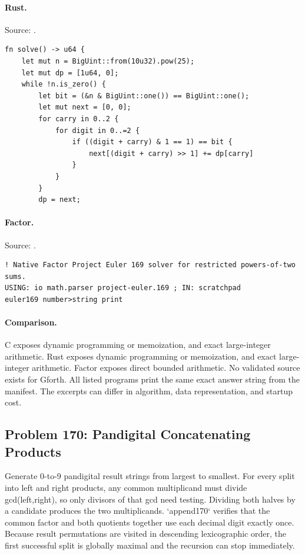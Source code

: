 \paragraph{Rust.} Source: .
\begin{lstlisting}
fn solve() -> u64 {
    let mut n = BigUint::from(10u32).pow(25);
    let mut dp = [1u64, 0];
    while !n.is_zero() {
        let bit = (&n & BigUint::one()) == BigUint::one();
        let mut next = [0, 0];
        for carry in 0..2 {
            for digit in 0..=2 {
                if ((digit + carry) & 1 == 1) == bit {
                    next[(digit + carry) >> 1] += dp[carry]
                }
            }
        }
        dp = next;
\end{lstlisting}

\paragraph{Factor.} Source: .
\begin{lstlisting}
! Native Factor Project Euler 169 solver for restricted powers-of-two sums.
USING: io math.parser project-euler.169 ; IN: scratchpad
euler169 number>string print
\end{lstlisting}

\paragraph{Comparison.}
C exposes dynamic programming or memoization, and exact large-integer arithmetic. Rust exposes dynamic programming or memoization, and exact large-integer arithmetic. Factor exposes direct bounded arithmetic.
No validated source exists for Gforth.
All listed programs print the same exact answer string from the manifest. The excerpts can differ in algorithm, data representation, and startup cost.

\subsection{Problem 170: Pandigital Concatenating Products}
\label{walkthrough:p170}
Generate 0-to-9 pandigital result strings from largest to smallest. For every split into left and right products, any common multiplicand must divide gcd(left,right), so only divisors of that gcd need testing. Dividing both halves by a candidate produces the two multiplicands. `append170` verifies that the common factor and both quotients together use each decimal digit exactly once. Because result permutations are visited in descending lexicographic order, the first successful split is globally maximal and the recursion can stop immediately.

